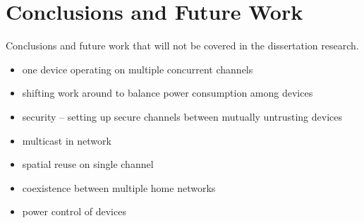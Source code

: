 \section{Conclusions and Future Work}
Conclusions and future work that will not be covered in the
dissertation research.

\begin{itemize}
\item one device operating on multiple concurrent channels
\item shifting work around to balance power consumption among devices
\item security -- setting up secure channels between mutually untrusting devices
\item multicast in network
\item spatial reuse on single channel
\item coexistence between multiple home networks
\item power control of devices
\end{itemize}